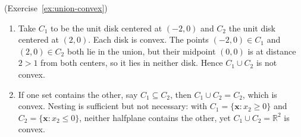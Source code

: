 \begin{solution}(Exercise~\ref{ex:union-convex})
\begin{enumerate}
    \item Take \( C_1 \) to be the unit disk centered at \( (-2,0) \) and \( C_2 \) the unit disk centered at \( (2,0) \). Each disk is convex. The points \( (-2,0) \in C_1 \) and \( (2,0) \in C_2 \) both lie in the union, but their midpoint \( (0,0) \) is at distance \( 2 > 1 \) from both centers, so it lies in neither disk. Hence \( C_1 \cup C_2 \) is not convex.
    \item If one set contains the other, say \( C_1 \subseteq C_2 \), then \( C_1 \cup C_2 = C_2 \), which is convex. Nesting is sufficient but not necessary: with \( C_1 = \{ \mathbf{x} : x_2 \geq 0 \} \) and \( C_2 = \{ \mathbf{x} : x_2 \leq 0 \} \), neither halfplane contains the other, yet \( C_1 \cup C_2 = \mathbb{R}^2 \) is convex.
\end{enumerate}
\end{solution}

